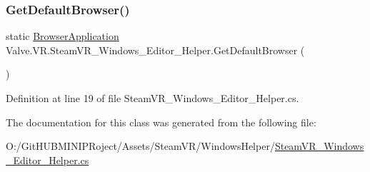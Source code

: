 \subsubsection{\texorpdfstring{GetDefaultBrowser()}{GetDefaultBrowser()}}
{\footnotesize\ttfamily static \mbox{\hyperlink{class_valve_1_1_v_r_1_1_steam_v_r___windows___editor___helper_adfefbc734f0accaba87a104ad1a88715}{Browser\+Application}} Valve.\+V\+R.\+Steam\+V\+R\+\_\+\+Windows\+\_\+\+Editor\+\_\+\+Helper.\+Get\+Default\+Browser (\begin{DoxyParamCaption}{ }\end{DoxyParamCaption})\hspace{0.3cm}{\ttfamily [static]}}



Definition at line 19 of file Steam\+V\+R\+\_\+\+Windows\+\_\+\+Editor\+\_\+\+Helper.\+cs.



The documentation for this class was generated from the following file\+:\begin{DoxyCompactItemize}
\item 
O\+:/\+Git\+H\+U\+B\+M\+I\+N\+I\+P\+Roject/\+Assets/\+Steam\+V\+R/\+Windows\+Helper/\mbox{\hyperlink{_steam_v_r___windows___editor___helper_8cs}{Steam\+V\+R\+\_\+\+Windows\+\_\+\+Editor\+\_\+\+Helper.\+cs}}\end{DoxyCompactItemize}
